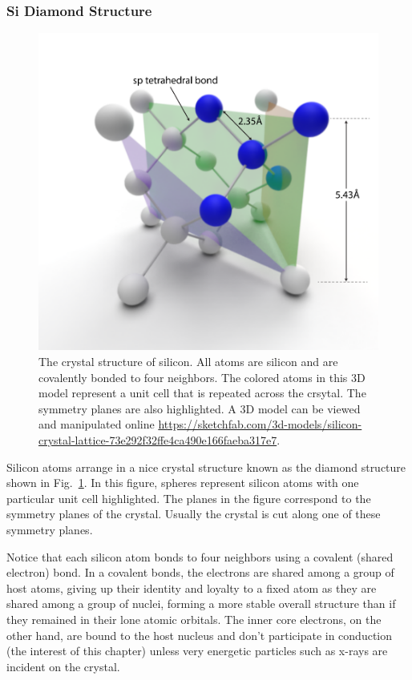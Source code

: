 \subsubsection{Si Diamond Structure}
\begin{figure}
\begin{center}
\includegraphics[width=.75\columnwidth]{silicon_crysal_label.pdf}
\end{center}
\caption{The crystal structure of silicon.  All atoms are silicon and are covalently bonded to four neighbors.  The colored atoms in this 3D model represent a unit cell that is repeated across the crsytal.  The symmetry planes are also highlighted.  A 3D model can be viewed and manipulated online \url{https://sketchfab.com/3d-models/silicon-crystal-lattice-73e292f32ffe4ca490e166faeba317e7}.  } \label{fig:silicon_crysal}
\end{figure}

Silicon atoms arrange in a nice crystal structure known as the diamond structure shown in Fig.~\ref{fig:silicon_crysal}.  In this figure, spheres represent silicon atoms with one particular unit cell highlighted.  The planes in the figure correspond to the symmetry planes of the crystal.  Usually the crystal is cut along one of these symmetry planes.

Notice that each silicon atom bonds to four neighbors using a covalent (shared electron) bond.  In a covalent bonds, the electrons are shared among a group of host atoms, giving up their identity and loyalty to a fixed atom as they are shared among a group of nuclei, forming a more stable overall structure than if they remained in their lone atomic orbitals.  The inner core electrons, on the other hand, are bound to the host nucleus and don't participate in conduction (the interest of this chapter) unless very energetic particles such as x-rays are incident on the crystal. 
